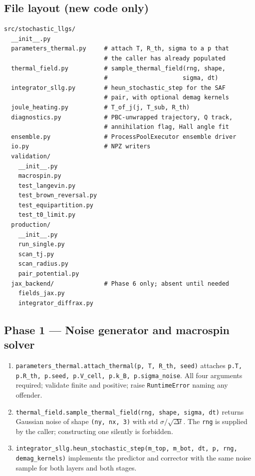 \documentclass[11pt,a4paper]{article}
\begin{document}
\subsection{File layout (new code only)}

\begin{lstlisting}
src/stochastic_llgs/
  __init__.py
  parameters_thermal.py     # attach T, R_th, sigma to a p that
                            # the caller has already populated
  thermal_field.py          # sample_thermal_field(rng, shape,
                            #                     sigma, dt)
  integrator_sllg.py        # heun_stochastic_step for the SAF
                            # pair, with optional demag kernels
  joule_heating.py          # T_of_j(j, T_sub, R_th)
  diagnostics.py            # PBC-unwrapped trajectory, Q track,
                            # annihilation flag, Hall angle fit
  ensemble.py               # ProcessPoolExecutor ensemble driver
  io.py                     # NPZ writers
  validation/
    __init__.py
    macrospin.py
    test_langevin.py
    test_brown_reversal.py
    test_equipartition.py
    test_t0_limit.py
  production/
    __init__.py
    run_single.py
    scan_tj.py
    scan_radius.py
    pair_potential.py
  jax_backend/              # Phase 6 only; absent until needed
    fields_jax.py
    integrator_diffrax.py
\end{lstlisting}

\subsection{Phase 1 --- Noise generator and macrospin solver}

\begin{enumerate}[leftmargin=2em]
    \item \texttt{parameters\_thermal.attach\_thermal(p, T, R\_th, seed)}
    attaches \texttt{p.T, p.R\_th, p.seed, p.V\_cell, p.k\_B,
    p.sigma\_noise}. All four arguments required; validate finite and
    positive; raise \texttt{RuntimeError} naming any offender.
    \item \texttt{thermal\_field.sample\_thermal\_field(rng, shape,
    sigma, dt)} returns Gaussian noise of shape
    \texttt{(ny, nx, 3)} with std $\sigma/\sqrt{\Delta t}$. The
    \texttt{rng} is supplied by the caller; constructing one
    silently is forbidden.
    \item \texttt{integrator\_sllg.heun\_stochastic\_step(m\_top,
    m\_bot, dt, p, rng, demag\_kernels)} implements the predictor and
    corrector with the same noise sample for both layers and both
    stages.
\end{enumerate}
\end{document}
